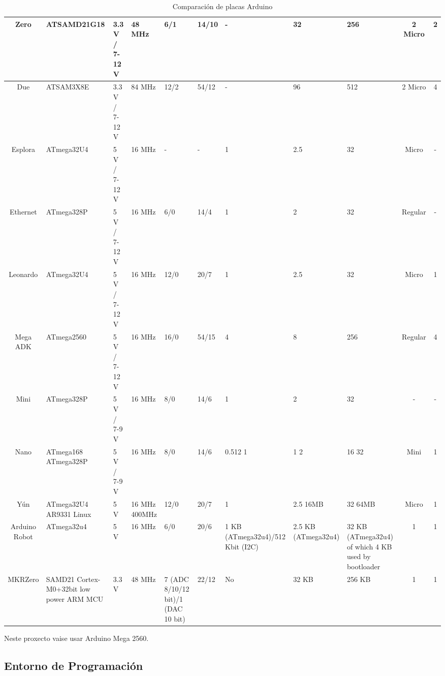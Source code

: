 \documentclass[11pt,twoside]{book}
\begin{document}
\begin{table}[htb]
\begin{center}
{\begin{tabular}{|c|m{3cm}|m{3.5cm}|m{2cm}|m{2cm}|m{2cm}|m{2cm}|m{2cm}|m{2cm}|c|c|}
\hline
Zero & ATSAMD21G18 & 3.3 V / 7-12 V & 48 MHz & 6/1 & 14/10 & - & 32 & 256 & 2 Micro & 2 \\
\hline
Due & ATSAM3X8E & 3.3 V / 7-12 V & 84 MHz & 12/2 & 54/12 & - & 96 & 512 & 2 Micro & 4\\
\hline
Esplora & ATmega32U4 & 5 V / 7-12 V & 16 MHz & - & - & 1 & 2.5 & 32 & Micro & - \\
\hline
Ethernet & ATmega328P & 5 V / 7-12 V & 16 MHz & 6/0 & 14/4 & 1 & 2 & 32 & Regular & - \\
\hline
Leonardo & ATmega32U4 & 5 V / 7-12 V & 16 MHz & 12/0 & 20/7 & 1 & 2.5 & 32 & Micro & 1 \\
\hline
Mega ADK & ATmega2560 & 5 V / 7-12 V & 16 MHz & 16/0 & 54/15 & 4 & 8 & 256 & Regular & 4 \\
\hline
Mini & ATmega328P & 5 V / 7-9 V & 16 MHz & 8/0 & 14/6 & 1 & 2 & 32 & - & - \\
\hline
Nano & ATmega168 \newline ATmega328P & 5 V / 7-9 V & 16 MHz & 8/0 & 14/6 & 0.512  1 & 1  2 & 16 32 & Mini & 1 \\
\hline
Yún & ATmega32U4 \newline AR9331 Linux & 5 V & 16 MHz \newline 400MHz & 12/0 & 20/7 & 1 & 2.5 \newline  16MB & 32 \newline   64MB & Micro & 1 \\
\hline
Arduino Robot & ATmega32u4 & 5 V & 16 MHz & 6/0 & 20/6 & 1 KB (ATmega32u4)/512 Kbit (I2C) & 2.5 KB (ATmega32u4) & 32 KB (ATmega32u4) of which 4 KB used by bootloader & 1 & 1 \\
\hline
MKRZero & SAMD21 \newline  Cortex-M0+32bit low power \newline ARM MCU & 3.3 V & 48 MHz & 7 (ADC 8/10/12 bit)/1 (DAC 10 bit) & 22/12 & No & 32 KB & 256 KB & 1 & 1 \\
\hline
\end{tabular}
}
\caption{Comparación de placas Arduino}
\label{taboa:comparacionPlacasArduino}
\end{center}
\end{table}

Neste proxecto vaise usar Arduino Mega 2560.

\subsection{Entorno de Programación}
\end{document}
